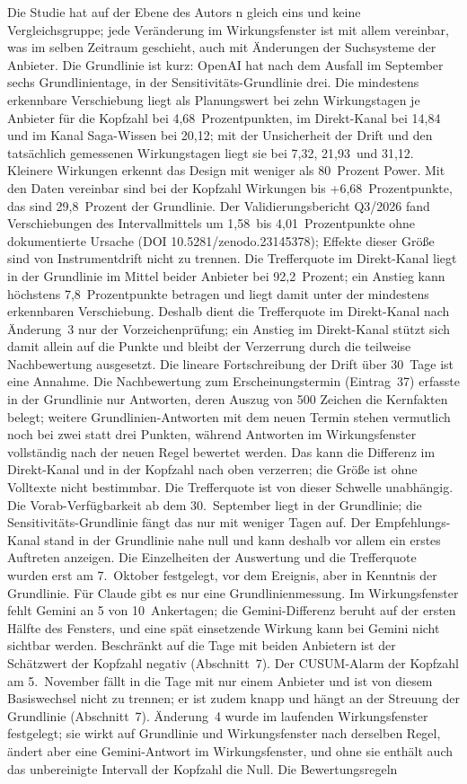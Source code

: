 \documentclass[11pt]{article}
\begin{document}
Die Studie hat auf der Ebene des Autors n gleich eins und keine Vergleichsgruppe; jede Veränderung im Wirkungsfenster ist mit allem vereinbar, was im selben Zeitraum geschieht, auch mit Änderungen der Suchsysteme der Anbieter. Die Grundlinie ist kurz: OpenAI hat nach dem Ausfall im September sechs Grundlinientage, in der Sensitivitäts-Grundlinie drei. Die mindestens erkennbare Verschiebung liegt als Planungswert bei zehn Wirkungstagen je Anbieter für die Kopfzahl bei 4,68~Prozentpunkten, im Direkt-Kanal bei 14,84 und im Kanal Saga-Wissen bei 20,12; mit der Unsicherheit der Drift und den tatsächlich gemessenen Wirkungstagen liegt sie bei 7,32, 21,93~und 31,12. Kleinere Wirkungen erkennt das Design mit weniger als 80~Prozent Power. Mit den Daten vereinbar sind bei der Kopfzahl Wirkungen bis +6,68~Prozentpunkte, das sind 29,8~Prozent der Grundlinie. Der Validierungsbericht Q3/2026 fand Verschiebungen des Intervallmittels um 1,58~bis 4,01~Prozentpunkte ohne dokumentierte Ursache (DOI 10.5281/zenodo.23145378); Effekte dieser Größe sind von Instrumentdrift nicht zu trennen. Die Trefferquote im Direkt-Kanal liegt in der Grundlinie im Mittel beider Anbieter bei 92,2~Prozent; ein Anstieg kann höchstens 7,8~Prozentpunkte betragen und liegt damit unter der mindestens erkennbaren Verschiebung. Deshalb dient die Trefferquote im Direkt-Kanal nach Änderung~3 nur der Vorzeichenprüfung; ein Anstieg im Direkt-Kanal stützt sich damit allein auf die Punkte und bleibt der Verzerrung durch die teilweise Nachbewertung ausgesetzt. Die lineare Fortschreibung der Drift über 30~Tage ist eine Annahme. Die Nachbewertung zum Erscheinungstermin (Eintrag~37) erfasste in der Grundlinie nur Antworten, deren Auszug von 500 Zeichen die Kernfakten belegt; weitere Grundlinien-Antworten mit dem neuen Termin stehen vermutlich noch bei zwei statt drei Punkten, während Antworten im Wirkungsfenster vollständig nach der neuen Regel bewertet werden. Das kann die Differenz im Direkt-Kanal und in der Kopfzahl nach oben verzerren; die Größe ist ohne Volltexte nicht bestimmbar. Die Trefferquote ist von dieser Schwelle unabhängig. Die Vorab-Verfügbarkeit ab dem 30.~September liegt in der Grundlinie; die Sensitivitäts-Grundlinie fängt das nur mit weniger Tagen auf. Der Empfehlungs-Kanal stand in der Grundlinie nahe null und kann deshalb vor allem ein erstes Auftreten anzeigen. Die Einzelheiten der Auswertung und die Trefferquote wurden erst am 7.~Oktober festgelegt, vor dem Ereignis, aber in Kenntnis der Grundlinie. Für Claude gibt es nur eine Grundlinienmessung. Im Wirkungsfenster fehlt Gemini an 5 von 10~Ankertagen; die Gemini-Differenz beruht auf der ersten Hälfte des Fensters, und eine spät einsetzende Wirkung kann bei Gemini nicht sichtbar werden. Beschränkt auf die Tage mit beiden Anbietern ist der Schätzwert der Kopfzahl negativ (Abschnitt~7). Der CUSUM-Alarm der Kopfzahl am 5.~November fällt in die Tage mit nur einem Anbieter und ist von diesem Basiswechsel nicht zu trennen; er ist zudem knapp und hängt an der Streuung der Grundlinie (Abschnitt~7). Änderung~4 wurde im laufenden Wirkungsfenster festgelegt; sie wirkt auf Grundlinie und Wirkungsfenster nach derselben Regel, ändert aber eine Gemini-Antwort im Wirkungsfenster, und ohne sie enthält auch das unbereinigte Intervall der Kopfzahl die Null. Die Bewertungsregeln 
\end{document}
